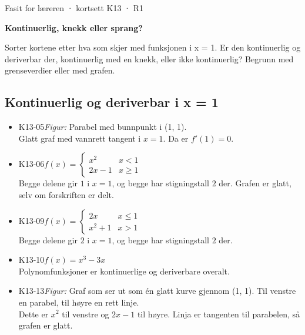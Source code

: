\documentclass[11pt,a4paper]{article}
\begin{document}
\begin{minipage}[t]{0.8\linewidth}\vspace{0pt}
{\sffamily\small\color{dempet}Fasit for læreren · kortsett K13 · R1}\par\vspace{0.25em}
{\fontsize{20}{24}\selectfont\bfseries Kontinuerlig, knekk eller sprang?}\par\vspace{0.5em}
Sorter kortene etter hva som skjer med funksjonen i x = 1. Er den kontinuerlig og deriverbar der, kontinuerlig med en knekk, eller ikke kontinuerlig? Begrunn med grenseverdier eller med grafen.\par{}
\end{minipage}\hfill
\begin{minipage}[t]{0.15\linewidth}\vspace{0pt}\raggedleft
{}
\end{minipage}\par\vspace{0.8em}

\subsection*{Kontinuerlig og deriverbar i x = 1}
\begin{itemize}[leftmargin=1.2em, itemsep=0.35em]
\item \textsf{\small K13-05}\quad \emph{Figur:} Parabel med bunnpunkt i (1, 1).\\{\small\color{dempet}Glatt graf med vannrett tangent i $x = 1$. Da er $f'(1) = 0$.}
\item \textsf{\small K13-06}\quad $f(x) = \begin{cases} x^2 & x < 1 \\ 2x - 1 & x \geq 1 \end{cases}$\\{\small\color{dempet}Begge delene gir $1$ i $x = 1$, og begge har stigningstall $2$ der. Grafen er glatt, selv om forskriften er delt.}
\item \textsf{\small K13-09}\quad $f(x) = \begin{cases} 2x & x \leq 1 \\ x^2 + 1 & x > 1 \end{cases}$\\{\small\color{dempet}Begge delene gir $2$ i $x = 1$, og begge har stigningstall $2$ der.}
\item \textsf{\small K13-10}\quad $f(x) = x^3 - 3x$\\{\small\color{dempet}Polynomfunksjoner er kontinuerlige og deriverbare overalt.}
\item \textsf{\small K13-13}\quad \emph{Figur:} Graf som ser ut som én glatt kurve gjennom (1, 1). Til venstre en parabel, til høyre en rett linje.\\{\small\color{dempet}Dette er $x^2$ til venstre og $2x - 1$ til høyre. Linja er tangenten til parabelen, så grafen er glatt.}
\end{itemize}
\end{document}
